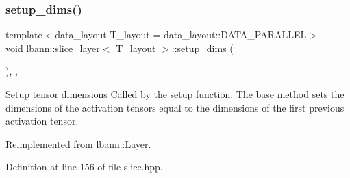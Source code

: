 \subsubsection{\texorpdfstring{setup\+\_\+dims()}{setup\_dims()}}
{\footnotesize\ttfamily template$<$data\+\_\+layout T\+\_\+layout = data\+\_\+layout\+::\+D\+A\+T\+A\+\_\+\+P\+A\+R\+A\+L\+L\+EL$>$ \\
void \hyperlink{classlbann_1_1slice__layer}{lbann\+::slice\+\_\+layer}$<$ T\+\_\+layout $>$\+::setup\+\_\+dims (\begin{DoxyParamCaption}{ }\end{DoxyParamCaption})\hspace{0.3cm}{\ttfamily [inline]}, {\ttfamily [override]}, {\ttfamily [virtual]}}

Setup tensor dimensions Called by the setup function. The base method sets the dimensions of the activation tensors equal to the dimensions of the first previous activation tensor. 

Reimplemented from \hyperlink{classlbann_1_1Layer_a90fce1b06c1f2abb480e18cfe08a9746}{lbann\+::\+Layer}.



Definition at line 156 of file slice.\+hpp.



